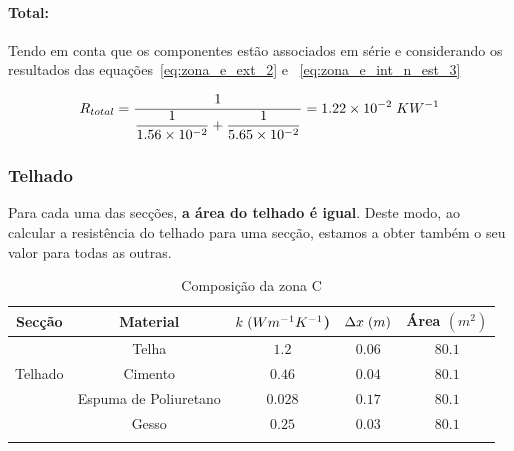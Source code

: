 \documentclass[12pt, a4paper]{article}
\begin{document}
\paragraph{Total:}\label{par:zona_e_total:} Tendo em conta que os componentes est\~ao
associados em série e considerando os resultados das
equa\c{c}\~oes~\ref{eq:zona_e_ext_2} e ~\ref{eq:zona_e_int_n_est_3}

\begin{equation}
	R_{total} =
	\dfrac{1}{
		\dfrac{1}{
			1.56 \times 10^{-2}
		}	+
		\dfrac{1}{
			5.65 \times 10^{-2}
		}
	}
	= 1.22 \times 10^{-2} \hspace{1mm} KW^{-1}
	\label{eq:zona_e_total}
\end{equation}



\subsubsection{Telhado}\label{ssub:Telhado}

Para cada uma das secções, \textbf{a área do telhado é igual}. Deste modo, ao calcular a resistência do telhado
para uma secção, estamos a obter também o seu valor para todas as outras.
\begin{table}[htpb]
	\begin{center}
		\begin{tabular}{c c c c c}
			\toprule{}
			Secção                     & Material               & $ k \hspace{1mm} (Wm^{-1}K^{-1}$) & $ \Delta x \hspace{1mm} (m)$ & Área $(m^2) $ \\
				\midrule{}

			\multirow{5}{*}{}          & Telha                  & $1.2$                             & $0.06$                       & $80.1$        \\
				\cline{2-5}
			Telhado                    & Cimento				& $0.46$                            & $0.04$                       & $80.1$        \\
				\cline{2-5}
			                           & Espuma de Poliuretano  & $0.028$                           & $0.17$                       & $80.1$        \\
				\cline{2-5}
									   & Gesso				 	& $0.25$                            & $0.03$                       & $80.1$        \\
			\bottomrule{}
		\end{tabular}
	\end{center}
	\caption{Composição da zona C}\label{tab:telhado}
\end{table}
\end{document}
